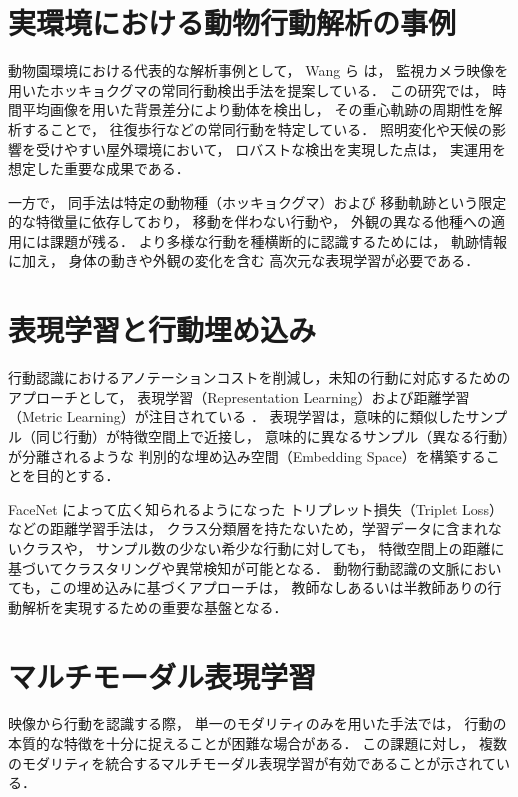 \section{実環境における動物行動解析の事例}

動物園環境における代表的な解析事例として，
Wang ら \cite{wang2023polarbear} は，
監視カメラ映像を用いたホッキョクグマの常同行動検出手法を提案している．
この研究では，
時間平均画像を用いた背景差分により動体を検出し，
その重心軌跡の周期性を解析することで，
往復歩行などの常同行動を特定している．
照明変化や天候の影響を受けやすい屋外環境において，
ロバストな検出を実現した点は，
実運用を想定した重要な成果である．

一方で，
同手法は特定の動物種（ホッキョクグマ）および
移動軌跡という限定的な特徴量に依存しており，
移動を伴わない行動や，
外観の異なる他種への適用には課題が残る．
より多様な行動を種横断的に認識するためには，
軌跡情報に加え，
身体の動きや外観の変化を含む
高次元な表現学習が必要である．

\section{表現学習と行動埋め込み}

行動認識におけるアノテーションコストを削減し，未知の行動に対応するためのアプローチとして，
表現学習（Representation Learning）および距離学習（Metric Learning）が注目されている \cite{bengio2013representation}．
表現学習は，意味的に類似したサンプル（同じ行動）が特徴空間上で近接し，
意味的に異なるサンプル（異なる行動）が分離されるような
判別的な埋め込み空間（Embedding Space）を構築することを目的とする．

FaceNet \cite{schroff2015facenet} によって広く知られるようになった
トリプレット損失（Triplet Loss）などの距離学習手法は，
クラス分類層を持たないため，学習データに含まれないクラスや，
サンプル数の少ない希少な行動に対しても，
特徴空間上の距離に基づいてクラスタリングや異常検知が可能となる．
動物行動認識の文脈においても，この埋め込みに基づくアプローチは，
教師なしあるいは半教師ありの行動解析を実現するための重要な基盤となる．

\section{マルチモーダル表現学習}

映像から行動を認識する際，
単一のモダリティのみを用いた手法では，
行動の本質的な特徴を十分に捉えることが困難な場合がある．
この課題に対し，
複数のモダリティを統合するマルチモーダル表現学習が有効であることが示されている．

